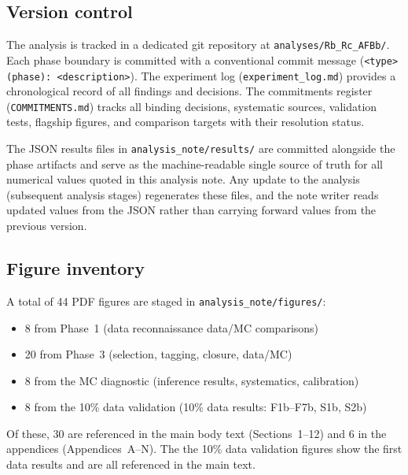 \documentclass[11pt,a4paper]{article}
\begin{document}
\subsection{Version control}

The analysis is tracked in a dedicated git repository at
\texttt{analyses/Rb\_Rc\_AFBb/}. Each phase boundary is committed with a
conventional commit message (\texttt{<type>(phase): <description>}). The
experiment log (\texttt{experiment\_log.md}) provides a chronological record
of all findings and decisions. The commitments register (\texttt{COMMITMENTS.md})
tracks all binding decisions, systematic sources, validation tests, flagship
figures, and comparison targets with their resolution status.

The JSON results files in \texttt{analysis\_note/results/} are committed alongside
the phase artifacts and serve as the machine-readable single source of truth for
all numerical values quoted in this analysis note. Any update to the analysis
(subsequent analysis stages) regenerates these files, and the note writer reads updated values
from the JSON rather than carrying forward values from the previous version.

\subsection{Figure inventory}

A total of 44 PDF figures are staged in \texttt{analysis\_note/figures/}:
\begin{itemize}
\item 8 from Phase~1 (data reconnaissance data/MC comparisons)
\item 20 from Phase~3 (selection, tagging, closure, data/MC)
\item 8 from the MC diagnostic (inference results, systematics, calibration)
\item 8 from the 10\% data validation (10\% data results: F1b--F7b, S1b, S2b)
\end{itemize}

Of these, 30 are referenced in the main body text (Sections~1--12) and 6 in
the appendices (Appendices~A--N). The the 10\% data validation figures show the first data results
and are all referenced in the main text.
\end{document}
